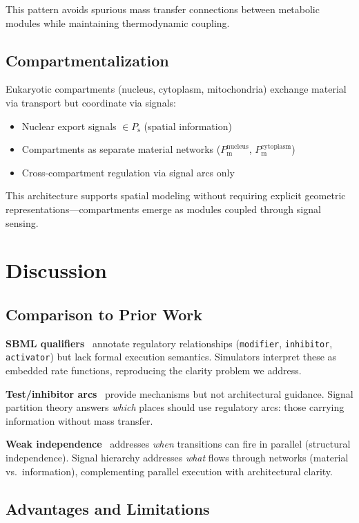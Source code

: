 \documentclass[twocolumn,10pt]{article}
\newcommand{\Pm}{P_{\text{m}}}
\newcommand{\Ps}{P_{\text{s}}}
\begin{document}
This pattern avoids spurious mass transfer connections between metabolic modules while maintaining thermodynamic coupling.

\subsection{Compartmentalization}

Eukaryotic compartments (nucleus, cytoplasm, mitochondria) exchange material via transport but coordinate via signals:
\begin{itemize}
\item Nuclear export signals $\in \Ps$ (spatial information)
\item Compartments as separate material networks ($\Pm^{\text{nucleus}}$, $\Pm^{\text{cytoplasm}}$)
\item Cross-compartment regulation via signal arcs only
\end{itemize}

This architecture supports spatial modeling without requiring explicit geometric representations---compartments emerge as modules coupled through signal sensing.

\section{Discussion}

\subsection{Comparison to Prior Work}

\textbf{SBML qualifiers}~\cite{lenovere2009sbgn} annotate regulatory relationships (\texttt{modifier}, \texttt{inhibitor}, \texttt{activator}) but lack formal execution semantics. Simulators interpret these as embedded rate functions, reproducing the clarity problem we address.

\textbf{Test/inhibitor arcs}~\cite{chaouiya2007petri} provide mechanisms but not architectural guidance. Signal partition theory answers \textit{which} places should use regulatory arcs: those carrying information without mass transfer.

\textbf{Weak independence}~\cite{simao2025weak} addresses \textit{when} transitions can fire in parallel (structural independence). Signal hierarchy addresses \textit{what} flows through networks (material vs.~information), complementing parallel execution with architectural clarity.

\subsection{Advantages and Limitations}
\end{document}
